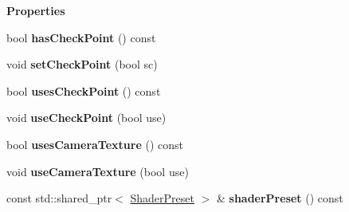 \begin{Indent}\textbf{ Properties}\par
\begin{DoxyCompactItemize}
\item 
\mbox{\label{classrev_1_1_post_processing_effect_aecd2c5d40cbcb8909f7e75d59b02e3c8}} 
bool {\bfseries has\+Check\+Point} () const
\item 
\mbox{\label{classrev_1_1_post_processing_effect_a8b70f3710513c614016cbad37eabbde0}} 
void {\bfseries set\+Check\+Point} (bool sc)
\item 
\mbox{\label{classrev_1_1_post_processing_effect_abaac5a6eeab77379f0a15c317eff83be}} 
bool {\bfseries uses\+Check\+Point} () const
\item 
\mbox{\label{classrev_1_1_post_processing_effect_aa5fe91b00179f4ea34950cbcd3730707}} 
void {\bfseries use\+Check\+Point} (bool use)
\item 
\mbox{\label{classrev_1_1_post_processing_effect_a235195311c61616e52635dd3dcbf96f7}} 
bool {\bfseries uses\+Camera\+Texture} () const
\item 
\mbox{\label{classrev_1_1_post_processing_effect_a869dab1d10383931d1af7154ef0c739a}} 
void {\bfseries use\+Camera\+Texture} (bool use)
\item 
\mbox{\label{classrev_1_1_post_processing_effect_a72d16b7bf0343a67cb77f54571b83d96}} 
const std\+::shared\+\_\+ptr$<$ \mbox{\hyperlink{classrev_1_1_shader_preset}{Shader\+Preset}} $>$ \& {\bfseries shader\+Preset} () const
\end{DoxyCompactItemize}
\end{Indent}

